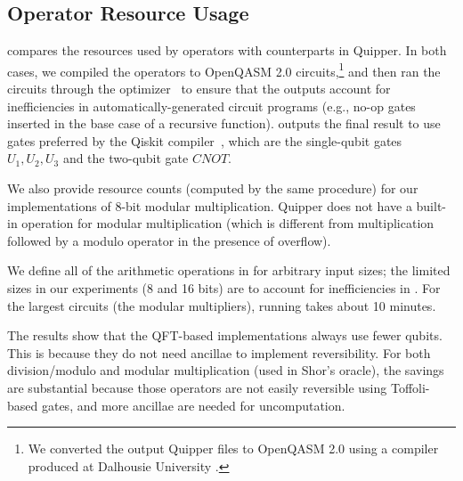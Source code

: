 
\subsection{Operator Resource Usage}

 compares the resources used by \vqir operators with counterparts in Quipper. In both cases, we compiled the operators to OpenQASM 2.0 circuits,\footnote{We converted the output Quipper files to OpenQASM 2.0 using a compiler produced at Dalhousie University \cite{quipper-qasm}.} and then ran the circuits through the \voqc optimizer~\cite{VOQC} to ensure that the outputs account for inefficiencies in automatically-generated circuit programs (e.g., no-op gates inserted in the base case of a recursive function). \voqc outputs the final result to use gates preferred by the Qiskit compiler~\cite{Qiskit}, which are the single-qubit gates $U_1, U_2, U_3$ and the two-qubit gate $CNOT$. 

We also provide resource counts (computed by the same procedure) for our implementations of 8-bit modular multiplication. Quipper does not have a built-in operation for modular multiplication (which is different from multiplication followed by a modulo operator in the presence of overflow). 

We define all of the arithmetic operations in  for arbitrary input sizes; the limited sizes in our experiments (8 and 16 bits) are to account for inefficiencies in \voqc. For the largest circuits (the modular multipliers), running \voqc takes about 10 minutes.


The results show that the QFT-based implementations always use fewer
qubits. This is because they do not need ancillae
to implement reversibility. For both division/modulo and modular
multiplication (used in Shor's oracle), the savings are substantial
because those operators are not easily reversible using Toffoli-based
gates, and more ancillae are needed for uncomputation.

